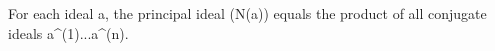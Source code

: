 For each ideal a, the principal ideal (N(a)) equals the product of all conjugate ideals a^(1)...a^(n).
